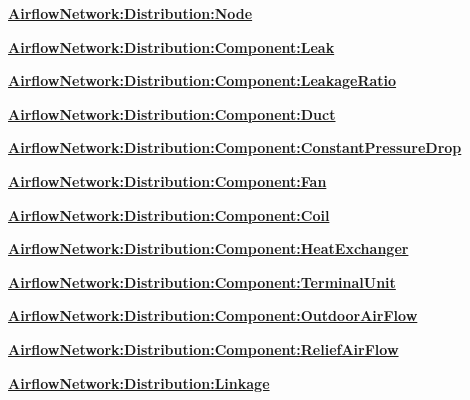 \textbf{\hyperref[airflownetworkdistributionnode]{AirflowNetwork:Distribution:Node}}

\textbf{\hyperref[airflownetworkdistributioncomponentleak]{AirflowNetwork:Distribution:Component:Leak}}

\textbf{\hyperref[airflownetworkdistributioncomponentleakageratio]{AirflowNetwork:Distribution:Component:LeakageRatio}}

\textbf{\hyperref[airflownetworkdistributioncomponentduct]{AirflowNetwork:Distribution:Component:Duct}}

\textbf{\hyperref[airflownetworkdistributioncomponentconstantpressuredrop]{AirflowNetwork:Distribution:Component:ConstantPressureDrop}}

\textbf{\hyperref[airflownetworkdistributioncomponentfan]{AirflowNetwork:Distribution:Component:Fan}}

\textbf{\hyperref[airflownetworkdistributioncomponentcoil]{AirflowNetwork:Distribution:Component:Coil}}

\textbf{\hyperref[airflownetworkdistributioncomponentheatexchanger]{AirflowNetwork:Distribution:Component:HeatExchanger}}

\textbf{\hyperref[airflownetworkdistributioncomponentterminalunit]{AirflowNetwork:Distribution:Component:TerminalUnit}}

\textbf{\hyperref[airflowNetworkdistributioncomponentoutdoorairflow]{AirflowNetwork:Distribution:Component:OutdoorAirFlow}}

\textbf{\hyperref[airflowNetworkdistributioncomponentreliefairflow]{AirflowNetwork:Distribution:Component:ReliefAirFlow}}

\textbf{\hyperref[airflownetworkdistributionlinkage]{AirflowNetwork:Distribution:Linkage}}

\textbf{~}

